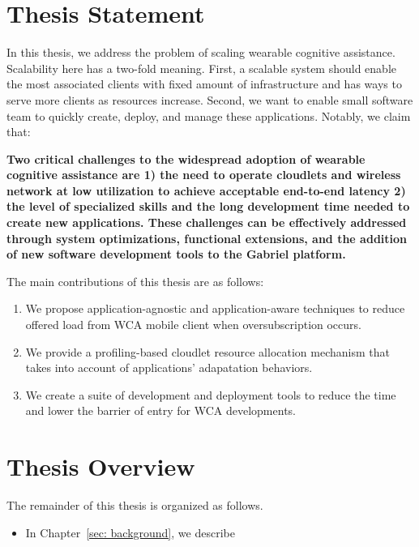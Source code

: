 \section{Thesis Statement}

In this thesis, we address the problem of scaling wearable cognitive assistance.
Scalability here has a two-fold meaning. First, a scalable system should enable
the most associated clients with fixed amount of infrastructure and has ways to
serve more clients as resources increase. Second, we want to enable small
software team to quickly create, deploy, and manage these applications. 
Notably, we claim that:

\textbf{Two critical challenges to the widespread adoption of wearable cognitive
  assistance are 1) the need to operate cloudlets and wireless network at low
  utilization to achieve acceptable end-to-end latency 2) the level of specialized
  skills and the long development time needed to create new applications. These
  challenges can be effectively addressed through system optimizations,
  functional extensions, and the addition of new software development tools to
  the Gabriel platform.}


The main contributions of this thesis are as follows:
\begin{enumerate}
  \item{We propose application-agnostic and application-aware techniques 
  to reduce offered load from WCA mobile client when oversubscription occurs.}
  \item{We provide a profiling-based cloudlet resource allocation mechanism that
  takes into account 
  of applications' adapatation behaviors.}
  \item{We create a suite of development and deployment tools to reduce the time
  and lower the barrier of entry for WCA developments.}
\end{enumerate}

\section{Thesis Overview}

The remainder of this thesis is organized as follows.

\begin{itemize}
  \item{In Chapter~\ref{sec: background}, we describe}
\end{itemize}